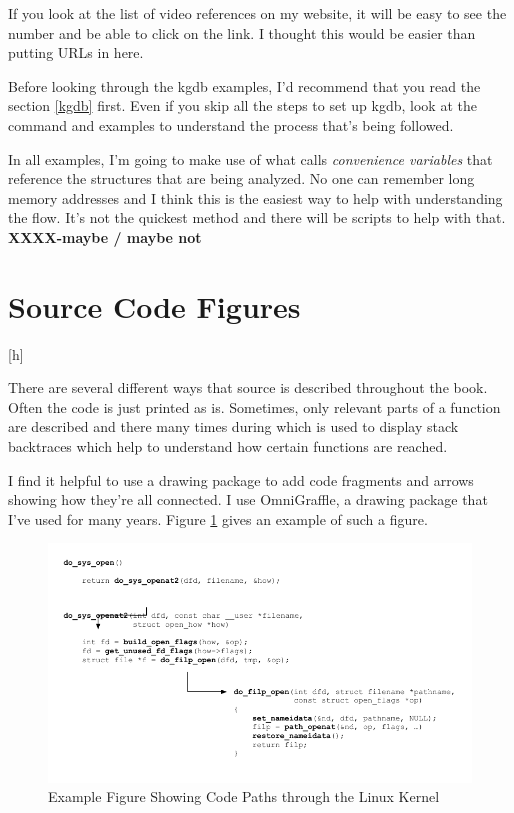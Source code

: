 \noindent
If you look at the list of video references on my website, it will be easy to see the number and be able to click on the link. I thought this would be easier than putting URLs in here.

Before looking through the kgdb examples, I'd recommend that you read the section \ref{kgdb} first. Even if you skip all the steps to set up kgdb, look at the command and examples to understand the process that's being followed. 

In all examples, I'm going to make use of what  calls \textit{convenience variables} that reference the structures that are being analyzed. No one can remember long memory addresses and I think this is the easiest way to help with understanding the flow. It's not the quickest method and there will be scripts to help with that. \textbf{XXXX-maybe / maybe not}


\section{Source Code Figures}[h]

There are several different ways that source is described throughout the book. Often the code is just printed as is. Sometimes, only relevant parts of a function are described and there many times during which  is used to display stack backtraces which help to understand how certain functions are reached.

I find it helpful to use a drawing package to add code fragments and arrows showing how they're all connected. I use OmniGraffle, a drawing package that I've used for many years. Figure \ref{fig:code-walkthrough} gives an example of such a figure.

\begin{figure}[h]
	\includegraphics[scale=0.64]{figures/code-walkthrough.pdf}
	\centering
	\caption{Example Figure Showing Code Paths through the Linux Kernel}
	\label{fig:code-walkthrough}
\end{figure}

